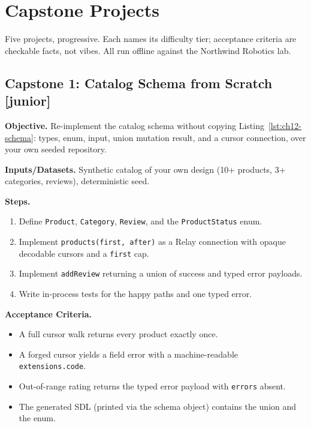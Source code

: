 \section{Capstone Projects}
\label{sec:ch12-capstones}

Five projects, progressive. Each names its difficulty tier; acceptance
criteria are checkable facts, not vibes. All run offline against the
Northwind Robotics lab.

\subsection{Capstone 1: Catalog Schema from Scratch [junior]}

\textbf{Objective.} Re-implement the catalog schema without copying
Listing~\ref{lst:ch12-schema}: types, enum, input, union mutation result,
and a cursor connection, over your own seeded repository.

\textbf{Inputs/Datasets.} Synthetic catalog of your own design (10+
products, 3+ categories, reviews), deterministic seed.

\textbf{Steps.}
\begin{enumerate}
  \item Define \texttt{Product}, \texttt{Category}, \texttt{Review}, and
        the \texttt{ProductStatus} enum.
  \item Implement \texttt{products(first, after)} as a Relay connection
        with opaque decodable cursors and a \texttt{first} cap.
  \item Implement \texttt{addReview} returning a union of success and
        typed error payloads.
  \item Write in-process tests for the happy paths and one typed error.
\end{enumerate}

\textbf{Acceptance Criteria.}
\begin{itemize}
  \item[$\square$] A full cursor walk returns every product exactly once.
  \item[$\square$] A forged cursor yields a field error with a
        machine-readable \texttt{extensions.code}.
  \item[$\square$] Out-of-range rating returns the typed error payload
        with \texttt{errors} absent.
  \item[$\square$] The generated SDL (printed via the schema object)
        contains the union and the enum.
\end{itemize}

